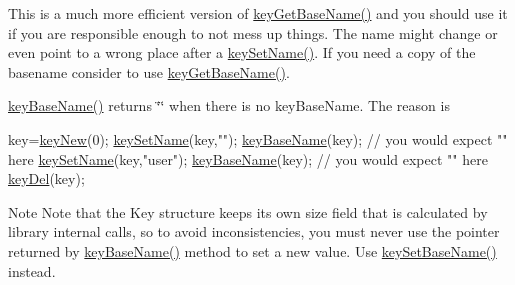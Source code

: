 This is a much more efficient version of \hyperlink{group__keyname_ga0992d26bcfca767cb8e77053a483eb64}{key\-Get\-Base\-Name()} and you should use it if you are responsible enough to not mess up things. The name might change or even point to a wrong place after a \hyperlink{group__keyname_ga7699091610e7f3f43d2949514a4b35d9}{key\-Set\-Name()}. If you need a copy of the basename consider to use \hyperlink{group__keyname_ga0992d26bcfca767cb8e77053a483eb64}{key\-Get\-Base\-Name()}.

\hyperlink{group__keyname_gaaff35e7ca8af5560c47e662ceb9465f5}{key\-Base\-Name()} returns \char`\"{}\char`\"{} when there is no key\-Base\-Name. The reason is 
\begin{DoxyCode}
key=\hyperlink{group__key_gaf6893c038b3ebee90c73a9ea8356bebf}{keyNew}(0);
\hyperlink{group__keyname_ga7699091610e7f3f43d2949514a4b35d9}{keySetName}(key,\textcolor{stringliteral}{""});
\hyperlink{group__keyname_gaaff35e7ca8af5560c47e662ceb9465f5}{keyBaseName}(key); \textcolor{comment}{// you would expect "" here}
\hyperlink{group__keyname_ga7699091610e7f3f43d2949514a4b35d9}{keySetName}(key,\textcolor{stringliteral}{"user"});
\hyperlink{group__keyname_gaaff35e7ca8af5560c47e662ceb9465f5}{keyBaseName}(key); \textcolor{comment}{// you would expect "" here}
\hyperlink{group__key_ga3df95bbc2494e3e6703ece5639be5bb1}{keyDel}(key);
\end{DoxyCode}


\begin{DoxyNote}{Note}
Note that the Key structure keeps its own size field that is calculated by library internal calls, so to avoid inconsistencies, you must never use the pointer returned by \hyperlink{group__keyname_gaaff35e7ca8af5560c47e662ceb9465f5}{key\-Base\-Name()} method to set a new value. Use \hyperlink{group__keyname_ga6e804bd453f98c28b0ff51430d1df407}{key\-Set\-Base\-Name()} instead.
\end{DoxyNote}

